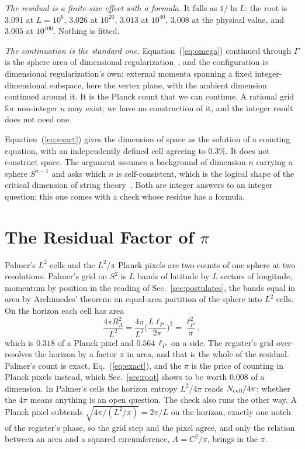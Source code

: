 \documentclass[aps,prd,twocolumn,superscriptaddress,nofootinbib]{revtex4-2}
\begin{document}
\textit{The residual is a finite-size effect with a formula.} It falls as $1/\ln L$: the root is $3.091$ at $L = 10^{6}$, $3.026$ at $10^{20}$, $3.013$ at $10^{40}$, $3.008$ at the physical value, and $3.005$ at $10^{100}$. Nothing is fitted.

\textit{The continuation is the standard one.} Equation~(\ref{eq:omega}) continued through $\Gamma$ is the sphere area of dimensional regularization~\cite{thooft1972}, and the configuration is dimensional regularization's own: external momenta spanning a fixed integer-dimensional subspace, here the vertex plane, with the ambient dimension continued around it. It is the Planck count that we can continue. A rational grid for non-integer $n$ may exist; we have no construction of it, and the integer result does not need one.

Equation~(\ref{eq:exact}) gives the dimension of space as the solution of a counting equation, with an independently defined cell agreeing to $0.3\%$. It does not construct space. The argument assumes a background of dimension $n$ carrying a sphere $S^{n-1}$ and asks which $n$ is self-consistent, which is the logical shape of the critical dimension of string theory~\cite{lovelace1971,goddard1972}. Both are integer answers to an integer question; this one comes with a check whose residue has a formula.

\section{The Residual Factor of $\pi$}
\label{sec:pi}

Palmer's $L^2$ cells and the $L^2/\pi$ Planck pixels are two counts of one sphere at two resolutions. Palmer's grid on $S^2$ is $L$ bands of latitude by $L$ sectors of longitude, momentum by position in the reading of Sec.~\ref{sec:postulates}, the bands equal in area by Archimedes' theorem: an equal-area partition of the sphere into $L^2$ cells. On the horizon each cell has area
\begin{equation}
\frac{4\pi R_\Lambda^2}{L^2} = \frac{4\pi}{L^2}\Big(\frac{L\ell_P}{2\pi}\Big)^2 = \frac{\ell_P^2}{\pi},
\label{eq:cell}
\end{equation}
which is $0.318$ of a Planck pixel and $0.564\,\ell_P$ on a side. The register's grid over-resolves the horizon by a factor $\pi$ in area, and that is the whole of the residual. Palmer's count is exact, Eq.~(\ref{eq:exact}), and the $\pi$ is the price of counting in Planck pixels instead, which Sec.~\ref{sec:root} shows to be worth $0.008$ of a dimension. In Palmer's cells the horizon entropy $L^2/4\pi$ reads $N_{\rm cell}/4\pi$; whether the $4\pi$ means anything is an open question. The check also runs the other way. A Planck pixel subtends $\sqrt{4\pi/(L^2/\pi)} = 2\pi/L$ on the horizon, exactly one notch of the register's phase, so the grid step and the pixel agree, and only the relation between an area and a squared circumference, $A = C^2/\pi$, brings in the $\pi$.
\end{document}
